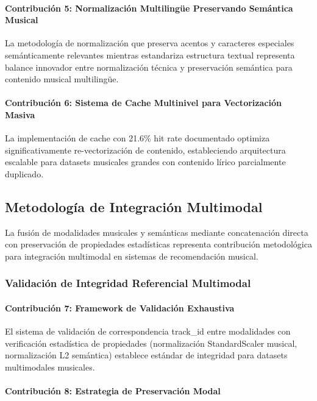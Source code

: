 \documentclass[12pt,a4paper]{article}
\begin{document}
\paragraph{Contribución 5: Normalización Multilingüe Preservando Semántica Musical}

La metodología de normalización que preserva acentos y caracteres especiales semánticamente relevantes mientras estandariza estructura textual representa balance innovador entre normalización técnica y preservación semántica para contenido musical multilingüe.

\paragraph{Contribución 6: Sistema de Cache Multinivel para Vectorización Masiva}

La implementación de cache con 21.6\% hit rate documentado optimiza significativamente re-vectorización de contenido, estableciendo arquitectura escalable para datasets musicales grandes con contenido lírico parcialmente duplicado.

\subsection{Metodología de Integración Multimodal}

La fusión de modalidades musicales y semánticas mediante concatenación directa con preservación de propiedades estadísticas representa contribución metodológica para integración multimodal en sistemas de recomendación musical.

\subsubsection{Validación de Integridad Referencial Multimodal}

\paragraph{Contribución 7: Framework de Validación Exhaustiva}

El sistema de validación de correspondencia track\_id entre modalidades con verificación estadística de propiedades (normalización StandardScaler musical, normalización L2 semántica) establece estándar de integridad para datasets multimodales musicales.

\paragraph{Contribución 8: Estrategia de Preservación Modal}
\end{document}

